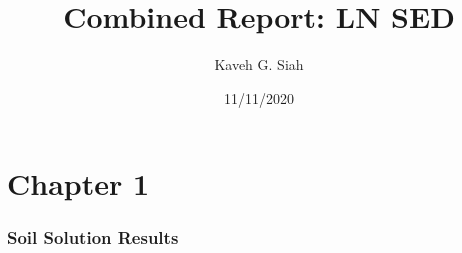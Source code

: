 \documentclass[
]{article}
\title{Combined Report: LN SED}
\author{Kaveh G. Siah}
\date{11/11/2020}
\begin{document}
\maketitle

\hypertarget{chapter-1}{%
\section{Chapter 1}\label{chapter-1}}

\newpage 
\tableofcontents
\listoffigures
\listoftables
\newpage

\hypertarget{soil-solution-results}{%
\subsubsection{Soil Solution Results}\label{soil-solution-results}}
\end{document}
